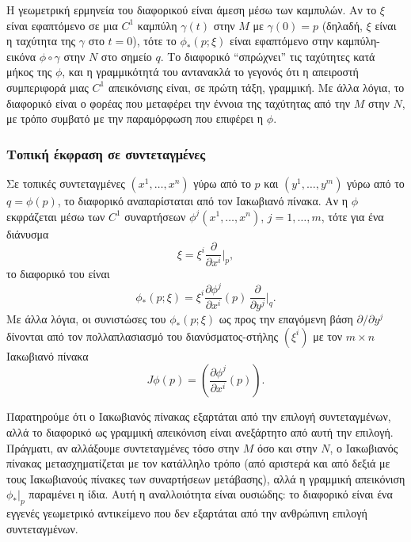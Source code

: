 \documentclass[11pt,a4paper,twoside,openright]{book}
\begin{document}
Η γεωμετρική ερμηνεία του διαφορικού είναι άμεση μέσω των καμπυλών. Αν το $\xi$ είναι εφαπτόμενο σε μια $C^1$ καμπύλη $\gamma(t)$ στην $M$ με $\gamma(0) = p$ (δηλαδή, $\xi$ είναι η ταχύτητα της $\gamma$ στο $t = 0$), τότε το $\phi_*(p; \xi)$ είναι εφαπτόμενο στην καμπύλη-εικόνα $\phi \circ \gamma$ στην $N$ στο σημείο $q$. Το διαφορικό ``σπρώχνει'' τις ταχύτητες κατά μήκος της $\phi$, και η γραμμικότητά του αντανακλά το γεγονός ότι η απειροστή συμπεριφορά μιας $C^1$ απεικόνισης είναι, σε πρώτη τάξη, γραμμική. Με άλλα λόγια, το διαφορικό είναι ο φορέας που μεταφέρει την έννοια της ταχύτητας από την $M$ στην $N$, με τρόπο συμβατό με την παραμόρφωση που επιφέρει η $\phi$.

\subsubsection{Τοπική έκφραση σε συντεταγμένες}

Σε τοπικές συντεταγμένες $(x^1, \dots, x^n)$ γύρω από το $p$ και $(y^1, \dots, y^m)$ γύρω από το $q = \phi(p)$, το διαφορικό αναπαρίσταται από τον Ιακωβιανό πίνακα. Αν η $\phi$ εκφράζεται μέσω των $C^1$ συναρτήσεων $\phi^j(x^1, \dots, x^n)$, $j = 1, \dots, m$, τότε για ένα διάνυσμα
\begin{equation}
\xi = \xi^i \frac{\partial}{\partial x^i}\bigg|_p,
\end{equation}
το διαφορικό του είναι
\begin{equation}
\phi_*(p; \xi) = \xi^i \frac{\partial \phi^j}{\partial x^i}(p) \, \frac{\partial}{\partial y^j}\bigg|_{q}. \label{eq:diff-coord}
\end{equation}
Με άλλα λόγια, οι συνιστώσες του $\phi_*(p; \xi)$ ως προς την επαγόμενη βάση $\partial / \partial y^j$ δίνονται από τον πολλαπλασιασμό του διανύσματος-στήλης $(\xi^i)$ με τον $m \times n$ Ιακωβιανό πίνακα
\begin{equation}
J\phi(p) = \left( \frac{\partial \phi^j}{\partial x^i}(p) \right).
\end{equation}

Παρατηρούμε ότι ο Ιακωβιανός πίνακας εξαρτάται από την επιλογή συντεταγμένων, αλλά το διαφορικό ως γραμμική απεικόνιση είναι ανεξάρτητο από αυτή την επιλογή. Πράγματι, αν αλλάξουμε συντεταγμένες τόσο στην $M$ όσο και στην $N$, ο Ιακωβιανός πίνακας μετασχηματίζεται με τον κατάλληλο τρόπο (από αριστερά και από δεξιά με τους Ιακωβιανούς πίνακες των συναρτήσεων μετάβασης), αλλά η γραμμική απεικόνιση $\phi_*|_p$ παραμένει η ίδια. Αυτή η αναλλοιότητα είναι ουσιώδης: το διαφορικό είναι ένα εγγενές γεωμετρικό αντικείμενο που δεν εξαρτάται από την ανθρώπινη επιλογή συντεταγμένων.
\end{document}
